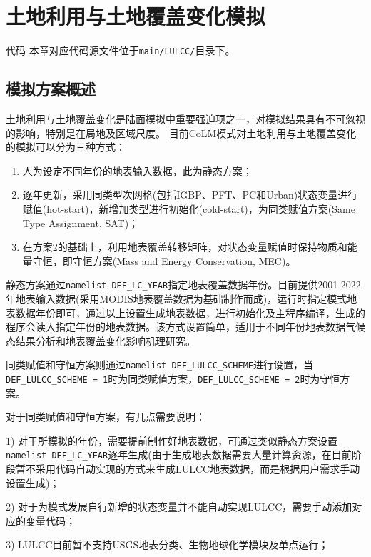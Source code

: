 \chapter{土地利用与土地覆盖变化模拟}\label{土地利用与土地覆盖变化模拟}
\begin{mymdframed}{代码}
  本章对应代码源文件位于\texttt{main/LULCC/}目录下。
\end{mymdframed}

\section{模拟方案概述}
土地利用与土地覆盖变化是陆面模拟中重要强迫项之一，对模拟结果具有不可忽视的影响，特别是在局地及区域尺度。
目前CoLM模式对土地利用与土地覆盖变化的模拟可以分为三种方式：
\begin{enumerate}
  \item 人为设定不同年份的地表输入数据，此为静态方案；
  \item 逐年更新，采用同类型次网格(包括IGBP、PFT、PC和Urban)状态变量进行赋值(hot-start)，新增加类型进行初始化(cold-start)，为同类赋值方案(Same Type Assignment, SAT)；
  \item 在方案2的基础上，利用地表覆盖转移矩阵，对状态变量赋值时保持物质和能量守恒，即守恒方案(Mass
    and Energy Conservation, MEC)。
\end{enumerate}

静态方案通过\texttt{namelist DEF\_LC\_YEAR}指定地表覆盖数据年份。目前提供2001-2022年地表输入数据(采用MODIS地表覆盖数据为基础制作而成)，运行时指定模式地表数据年份即可，通过以上设置生成地表数据，进行初始化及主程序编译，生成的程序会读入指定年份的地表数据。该方式设置简单，适用于不同年份地表数据气候态结果分析和地表覆盖变化影响机理研究。

同类赋值和守恒方案则通过\texttt{namelist DEF\_LULCC\_SCHEME}进行设置，当
\texttt{DEF\_LULCC\allowbreak \_SCHEME = 1}时为同类赋值方案，\texttt{DEF\_LULCC\_SCHEME = 2}时为守恒方案。

对于同类赋值和守恒方案，有几点需要说明：

1) 对于所模拟的年份，需要提前制作好地表数据，可通过类似静态方案设置\texttt{namelist DEF\_LC\_YEAR}逐年生成(由于生成地表数据需要大量计算资源，在目前阶段暂不采用代码自动实现的方式来生成LULCC地表数据，而是根据用户需求手动设置生成)；

2) 对于为模式发展自行新增的状态变量并不能自动实现LULCC，需要手动添加对应的变量代码；

3) LULCC目前暂不支持USGS地表分类、生物地球化学模块及单点运行；

